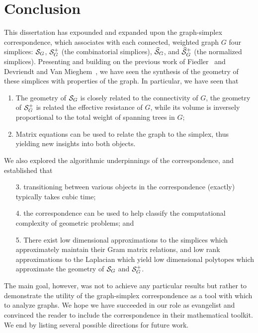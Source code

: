 \chapter{Conclusion}
\label{chap:conclusion}



This dissertation has expounded  and  expanded upon the graph-simplex correspondence, which associates with each connected, weighted graph $G$ four simplices: $\mathcal{S}_G$, $\mathcal{S}_G^+$ (the combinatorial simplices), $\widehat{\mathcal{S}}_G$, and $\widehat{\mathcal{S}}_G^+$ (the normalized simplices).  
Presenting and building on  the previous work of Fiedler~\cite{fiedler1993geometric,fiedler2011matrices} and Devriendt and Van Mieghem~\cite{devriendt2018simplex}, we have seen the synthesis of the geometry of these  simplices with properties of the graph. In particular, we have seen that 
\begin{enumerate}
	\item The geometry of $\mathcal{S}_G$ is closely related to  the connectivity of $G$, the geometry of  $\mathcal{S}_G^+$ is related the effective resistance of $G$, while its volume is inversely proportional to the total weight of spanning trees  in $G$; 
	\item Matrix equations can  be used to relate the graph to the  simplex,  thus yielding new insights into  both objects.  
\end{enumerate}
We also explored the  algorithmic underpinnings  of  the correspondence, and established that 
\begin{enumerate}
	\item[3.] transitioning between various objects in the correspondence (exactly) typically takes cubic time; 
	\item[4.] the correspondence can be used to help classify the computational complexity of geometric problems; and 
	\item[5.] There exist low dimensional  approximations  to the simplices which approximately maintain their Gram matrix relations, and low rank  approximations to the Laplacian  which yield low dimensional polytopes which approximate the geometry  of $\mathcal{S}_G$ and $\mathcal{S}_G^+$. 
\end{enumerate}
The main goal,  however,  was not to achieve any particular results but rather to demonstrate the utility of  the graph-simplex correspondence as  a tool with which  to  analyze  graphs. We hope we have succeeded in our role as evangelist and  convinced the reader to include the correspondence in their mathematical toolkit. We end  by listing several possible directions for future work. 


